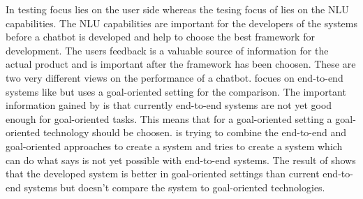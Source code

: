 In \citet{evaluateChatbotsShawar2007} testing focus lies on the user side whereas the tesing focus of 
\citet{braunEvaluatingNLU} lies on the NLU capabilities.
The NLU capabilities are important for the developers of the systems before a chatbot
is developed and help to choose the best framework for development.
The users feedback is a valuable source of information for the actual product and
is important after the framework has been choosen.
These are two very different views on the performance of a chatbot.
\citet{bordes2016learning} focues on end-to-end systems like \citet{evaluateChatbotsShawar2007, williams2017hybrid}
but uses a goal-oriented setting for the comparison.
The important information gained by \citet{bordes2016learning} is that currently end-to-end systems 
are not yet good enough for goal-oriented tasks.
This means that for a goal-oriented setting a goal-oriented technology should be choosen.
\citet{williams2017hybrid} is trying to combine the end-to-end and goal-oriented approaches to 
create a system and tries to create a system which can do what \citet{bordes2016learning} says is not yet 
possible with end-to-end systems. 
The result of \citet{williams2017hybrid} shows that the developed system is better in goal-oriented 
settings than current end-to-end systems but doesn't compare the system to goal-oriented technologies.

